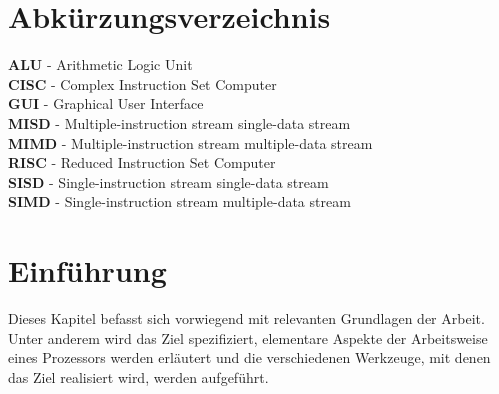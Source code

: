 \documentclass[12pt]{article}
\begin{document}
\newpage

\thispagestyle{empty}
\tableofcontents

\newpage

\thispagestyle{plain}
\cleardoublepage
{}
\listoffigures

\listoftables

\lstlistoflistings

\newpage

\thispagestyle{plain}
\cleardoublepage
\section*{Abkürzungsverzeichnis}
\textbf{ALU} - Arithmetic Logic Unit\\
\textbf{CISC} - Complex Instruction Set Computer\\
\textbf{GUI} - Graphical User Interface\\
\textbf{MISD} - Multiple-instruction stream single-data stream\\
\textbf{MIMD} - Multiple-instruction stream multiple-data stream\\
\textbf{RISC} - Reduced Instruction Set Computer\\
\textbf{SISD} - Single-instruction stream single-data stream\\
\textbf{SIMD} - Single-instruction stream multiple-data stream

\newpage
{}

\pagestyle{scrheadings} %

\clearpairofpagestyles
\clearmainofpairofpagestyles

\ihead[]{\leftmark} %

\cfoot[\pagemark]{\pagemark} %



\section{Einführung}
Dieses Kapitel befasst sich vorwiegend mit relevanten Grundlagen der Arbeit. Unter anderem wird das Ziel spezifiziert, elementare Aspekte der Arbeitsweise eines Prozessors werden erläutert und die verschiedenen Werkzeuge, mit denen das Ziel realisiert wird, werden aufgeführt.
\end{document}
